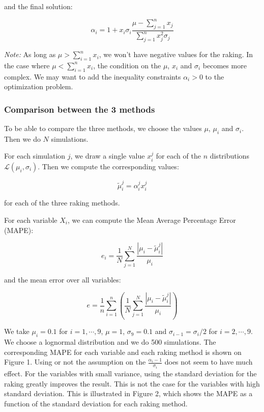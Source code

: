 and the final solution:

\begin{equation*}
\alpha_i = 1 + x_i \sigma_i \frac{\mu - \sum_{j = 1}^n x_j}{\sum_{j = 1}^n x_j^2 \sigma_j}
\end{equation*}

\textit{Note:}
As long as $\mu > \sum_{i = 1}^n x_i$, we won't have negative values for the raking. In the case where $\mu < \sum_{i = 1}^n x_i$, the condition on the $\mu$, $x_i$ and $\sigma_i$ becomes more complex. We may want to add the inequality constraints $\alpha_i > 0$ to the optimization problem.

\subsubsection{Comparison between the 3 methods}

To be able to compare the three methods, we choose the values $\mu$, $\mu_i$ and $\sigma_i$. Then we do $N$ simulations.

For each simulation $j$, we draw a single value $x_i^j$ for each of the $n$ distributions $\mathcal{L} \left( \mu_i , \sigma_i \right)$. Then we compute the corresponding values:

\begin{equation*}
\tilde{\mu}_i^j = \alpha_i^j x_i^j
\end{equation*}

for each of the three raking methods.

For each variable $X_i$, we can compute the Mean Average Percentage Error (MAPE):

\begin{equation*}
e_i = \frac{1}{N} \sum_{j = 1}^N \frac{\left\vert \mu_i - \tilde{\mu}_i^j \right\vert}{\mu_i}
\end{equation*}

and the mean error over all variables:

\begin{equation*}
e = \frac{1}{n} \sum_{i = 1}^n \left( \frac{1}{N} \sum_{j = 1}^N \frac{\left\vert \mu_i - \tilde{\mu}_i^j \right\vert}{\mu_i} \right)
\end{equation*}

We take $\mu_i = 0.1$ for $i = 1 , \cdots , 9$, $\mu = 1$, $\sigma_9 = 0.1$ and $\sigma_{i - 1} = \sigma_{i} / 2$ for $i = 2 , \cdots , 9$. We choose a lognormal distribution and we do 500 simulations. The corresponding MAPE for each variable and each raking method is shown on Figure 1. Using or not the assumption on the $\frac{\alpha_i - 1}{\sigma_i}$ does not seem to have much effect. For the variables with small variance, using the standard deviation for the raking greatly improves the result. This is not the case for the variables with high standard deviation. This is illustrated in Figure 2, which shows the MAPE as a function of the standard deviation for each raking method.

